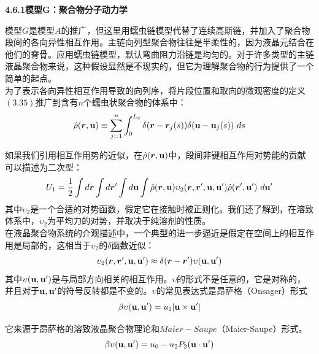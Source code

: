 \textbf{4.6.1模型G：聚合物分子动力学}

模型$G$是模型$A$的推广，但这里用蠕虫链模型代替了连续高斯链，并加入了聚合物段间的各向异性相互作用。主链向列型聚合物往往是半柔性的，因为液晶元结合在他们的脊骨。应用蠕虫链模型，默认弯曲阻力沿链是均匀的。对于许多类型的主链液晶聚合物来说，这种假设显然是不现实的，但它为理解聚合物的行为提供了一个简单的起点。\\

为了表示各向异性相互作用导致的向列序，将片段位置和取向的微观密度的定义$(3.35)$推广到含有$n$个蠕虫状聚合物的体系中：\\
\begin{equation}
\hat{\rho}(\bm{r},\mathbf{u}) \equiv \sum_{j=1}^{n} \int _{0}^{L_{c}} \delta(\bm{r}-\bm{r}_{j}(s)) \delta (\mathbf{u}-\mathbf{u}_{j}(s))~ds
\end{equation}

如果我们引用相互作用势的近似，在$\hat{\rho}(\bm{r},\mathbf{u})$中，段间非键相互作用对势能的贡献可以描述为二次型：\\
\begin{equation}
U_1=\frac{1}{2} \int d\bm{r} \int d\bm{r}' \int d\mathbf{u} \int  \hat{\rho}(\bm{r},\mathbf{u}) \upsilon_2(\bm{r},\bm{r}',\mathbf{u},\mathbf{u}') \hat{\rho}(\bm{r}',\mathbf{u}')~d\mathbf{u}'
\end{equation}
其中$\upsilon_2$是一个合适的对势函数，假定它在接触时被正则化。我们还了解到，在溶致体系中，$\upsilon_2$为平均力的对势，并取决于纯溶剂的性质。\\

在液晶聚合物系统的介观描述中，一个典型的进一步逼近是假定在空间上的相互作用是局部的，这相当于$\upsilon_2$的$\delta$函数近似：\\
\begin{equation}
\upsilon_{2}(\bm{r},\bm{r}',\mathbf{u},\mathbf{u}') \approx \delta(\bm{r}-\bm{r}') \upsilon(\mathbf{u},\mathbf{u}')
\end{equation}
其中$\upsilon(\mathbf{u},\mathbf{u}')$是与局部方向相关的相互作用。$\upsilon$的形式不是任意的，它是对称的，并且对于$\mathbf{u},\mathbf{u}'$的符号反转都是不变的。$\upsilon$的常见表达式是昂萨格（Onsager）形式\\
\begin{equation}
\beta \upsilon(\mathbf{u},\mathbf{u}')= u_{1}|\mathbf{u}\times \mathbf{u}'|
\end{equation}

它来源于昂萨格的溶致液晶聚合物理论和$Maier-Saupe$（Maier-Saupe）形式。\\
\begin{equation}
\beta \upsilon(\mathbf{u},\mathbf{u}')=u_0 - u_{2} P_{2}(\mathbf{u} \cdot \mathbf{u}')
\end{equation}

